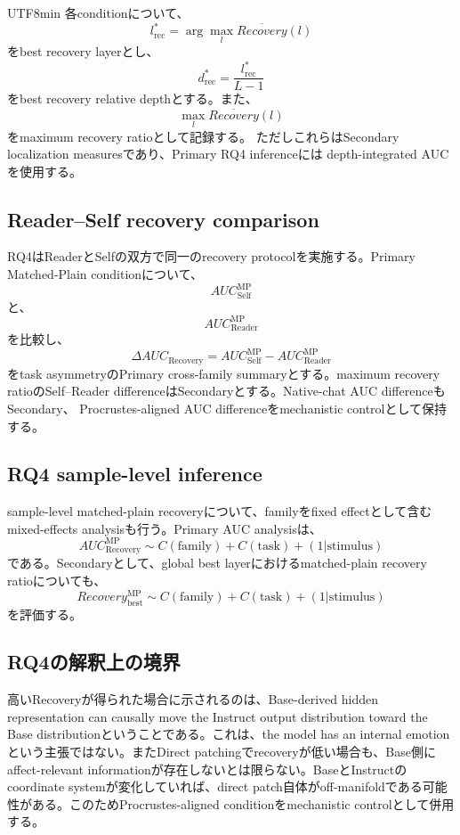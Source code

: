 \documentclass{article} %
\begin{document}
\begin{CJK*}{UTF8}{min}
各conditionについて、
\[
l_{\mathrm{rec}}^{*}
=
\arg\max_l
\overline{Recovery}(l)
\]
をbest recovery layerとし、
\[
d_{\mathrm{rec}}^{*}
=
\frac{
l_{\mathrm{rec}}^{*}
}{
L-1
}
\]
をbest recovery relative depthとする。また、
\[
\max_l\overline{Recovery}(l)
\]
をmaximum recovery ratioとして記録する。
ただしこれらはSecondary localization measuresであり、Primary RQ4 inferenceには
depth-integrated AUCを使用する。


\subsection{Reader--Self recovery comparison}

RQ4はReaderとSelfの双方で同一のrecovery protocolを実施する。Primary Matched-Plain conditionについて、
\[
AUC_{\mathrm{Self}}^{\mathrm{MP}}
\]
と、
\[
AUC_{\mathrm{Reader}}^{\mathrm{MP}}
\]
を比較し、
\[
\Delta AUC_{\mathrm{Recovery}}
=
AUC_{\mathrm{Self}}^{\mathrm{MP}}
-
AUC_{\mathrm{Reader}}^{\mathrm{MP}}
\]
をtask asymmetryのPrimary cross-family summaryとする。maximum recovery ratioのSelf--Reader differenceはSecondaryとする。Native-chat AUC differenceもSecondary、
Procrustes-aligned AUC differenceをmechanistic controlとして保持する。


\subsection{RQ4 sample-level inference}

sample-level matched-plain recoveryについて、familyをfixed effectとして含むmixed-effects analysisも行う。Primary AUC analysisは、
\[
AUC_{\mathrm{Recovery}}^{\mathrm{MP}}
\sim
C(\mathrm{family})
+
C(\mathrm{task})
+
(1|\mathrm{stimulus})
\]
である。Secondaryとして、global best layerにおけるmatched-plain recovery ratioについても、
\[
Recovery_{\mathrm{best}}^{\mathrm{MP}}
\sim
C(\mathrm{family})
+
C(\mathrm{task})
+
(1|\mathrm{stimulus})
\]
を評価する。


\subsection{RQ4の解釈上の境界}

高いRecoveryが得られた場合に示されるのは、Base-derived hidden representation can causally move the Instruct output distribution toward the Base distributionということである。これは、the model has an internal emotionという主張ではない。またDirect patchingでrecoveryが低い場合も、Base側にaffect-relevant informationが存在しないとは限らない。BaseとInstructのcoordinate systemが変化していれば、direct patch自体がoff-manifoldである可能性がある。このためProcrustes-aligned conditionをmechanistic controlとして併用する。



\end{CJK*}
\end{document}

